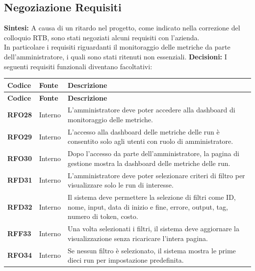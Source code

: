 \documentclass{article}
\begin{document}
    \subsection{Negoziazione Requisiti}
    \textbf{Sintesi:} A causa di un ritardo nel progetto, come indicato nella correzione 
    del colloquio RTB, sono stati negoziati alcuni requisiti con l'azienda. \\
    In particolare i requisiti riguardanti il monitoraggio delle metriche da parte 
    dell'amministratore, i quali sono stati ritenuti non essenziali.
    \textbf{Decisioni:} I seguenti requisiti funzionali diventano facoltativi:

    \begin{longtable}{|>{\centering\arraybackslash}m{}|>{\centering\arraybackslash}m{}|>{\arraybackslash}m{}|}
    	\hline
    	\textbf{Codice} & \textbf{Fonte} & \textbf{Descrizione}\\\hline
    	\endfirsthead
    	\hline
    	\textbf{Codice} & \textbf{Fonte} & \textbf{Descrizione}\\\hline
    	\endhead
    	\hline
    	\textbf{RFO28} & Interno 			& L'amministratore deve poter accedere alla dashboard di monitoraggio delle metriche. \\
    	\hline
    	\textbf{RFO29} & Interno 			& L’accesso alla dashboard delle metriche delle run è consentito solo agli utenti con ruolo di amministratore. \\
    	\hline
    	\textbf{RFO30} & Interno 			& Dopo l’accesso da parte dell'amministratore, la pagina di gestione mostra la dashboard delle metriche delle run. \\
    	\hline
    	\textbf{RFD31} & Interno 			& L’amministratore deve poter selezionare criteri di filtro per visualizzare solo le run di interesse. \\
    	\hline
    	\textbf{RFD32} & Interno 			& Il sistema deve permettere la selezione di filtri come ID, nome, input, data di inizio e fine, errore, output, tag, numero di token, costo. \\
    	\hline
    	\textbf{RFF33} & Interno 			& Una volta selezionati i filtri, il sistema deve aggiornare la visualizzazione senza ricaricare l'intera pagina. \\
    	\hline
    	\textbf{RFO34} & Interno 			& Se nessun filtro è selezionato, il sistema mostra le prime dieci run per impostazione predefinita. \\

\end{longtable}
\end{document}
